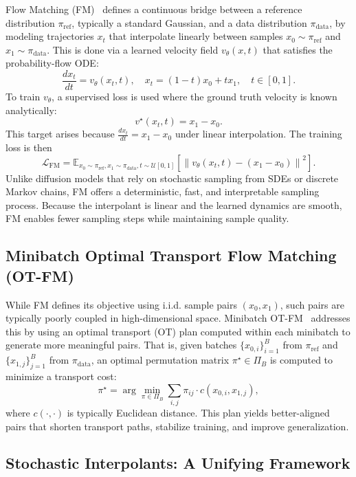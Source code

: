 \documentclass{article}
\begin{document}
Flow Matching (FM)~\cite{lipman2023fm} defines a continuous bridge between a reference distribution \(\pi_{\mathrm{ref}}\), typically a standard Gaussian, and a data distribution \(\pi_{\mathrm{data}}\), by modeling trajectories \(x_t\) that interpolate linearly between samples \(x_0 \sim \pi_{\mathrm{ref}}\) and \(x_1 \sim \pi_{\mathrm{data}}\). This is done via a learned velocity field \(v_\theta(x, t)\) that satisfies the probability-flow ODE:
\[
\frac{dx_t}{dt} = v_\theta(x_t, t), \quad x_t = (1 - t)x_0 + t x_1, \quad t \in [0,1].
\]
To train \(v_\theta\), a supervised loss is used where the ground truth velocity is known analytically:
\[
v^\star(x_t, t) = x_1 - x_0.
\]
This target arises because \(\frac{dx_t}{dt} = x_1 - x_0\) under linear interpolation. The training loss is then
\[
\mathcal{L}_{\mathrm{FM}} = \mathbb{E}_{x_0 \sim \pi_{\mathrm{ref}}, x_1 \sim \pi_{\mathrm{data}}, t \sim \mathcal{U}[0,1]} \left[ \left\| v_\theta(x_t, t) - (x_1 - x_0) \right\|^2 \right].
\]
Unlike diffusion models that rely on stochastic sampling from SDEs or discrete Markov chains, FM offers a deterministic, fast, and interpretable sampling process. Because the interpolant is linear and the learned dynamics are smooth, FM enables fewer sampling steps while maintaining sample quality.

\subsection{Minibatch Optimal Transport Flow Matching (OT-FM)}

While FM defines its objective using i.i.d. sample pairs \((x_0, x_1)\), such pairs are typically poorly coupled in high-dimensional space. Minibatch OT-FM~\cite{tong2024otfm} addresses this by using an optimal transport (OT) plan computed within each minibatch to generate more meaningful pairs. That is, given batches \(\{x_{0,i}\}_{i=1}^B\) from \(\pi_{\mathrm{ref}}\) and \(\{x_{1,j}\}_{j=1}^B\) from \(\pi_{\mathrm{data}}\), an optimal permutation matrix \(\pi^\star \in \Pi_B\) is computed to minimize a transport cost:
\[
\pi^\star = \arg\min_{\pi \in \Pi_B} \sum_{i,j} \pi_{ij} \cdot c(x_{0,i}, x_{1,j}),
\]
where \(c(\cdot, \cdot)\) is typically Euclidean distance. This plan yields better-aligned pairs that shorten transport paths, stabilize training, and improve generalization.

\subsection{Stochastic Interpolants: A Unifying Framework}
\end{document}
